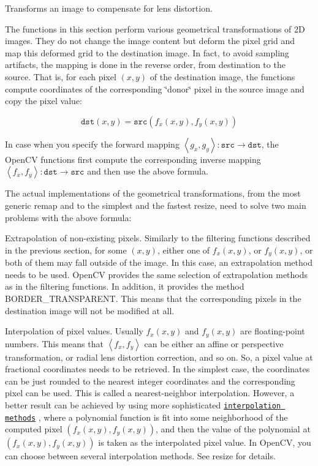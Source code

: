 Transforms an image to compensate for lens distortion.

The functions in this section perform various geometrical transformations of 2D images. They do not change the image content but deform the pixel grid and map this deformed grid to the destination image. In fact, to avoid sampling artifacts, the mapping is done in the reverse order, from destination to the source. That is, for each pixel $(x, y)$ of the destination image, the functions compute coordinates of the corresponding \char`\"{}donor\char`\"{} pixel in the source image and copy the pixel value\+: 

\[\texttt{dst} (x,y)= \texttt{src} (f_x(x,y), f_y(x,y))\] 

In case when you specify the forward mapping $\left<g_x, g_y\right>: \texttt{src} \rightarrow \texttt{dst}$, the Open\+CV functions first compute the corresponding inverse mapping $\left<f_x, f_y\right>: \texttt{dst} \rightarrow \texttt{src}$ and then use the above formula. 

The actual implementations of the geometrical transformations, from the most generic remap and to the simplest and the fastest resize, need to solve two main problems with the above formula\+: 


\begin{DoxyItemize}
\item Extrapolation of non-\/existing pixels. Similarly to the filtering functions described in the previous section, for some $(x,y)$, either one of $f_x(x,y)$, or $f_y(x,y)$, or both of them may fall outside of the image. In this case, an extrapolation method needs to be used. Open\+CV provides the same selection of extrapolation methods as in the filtering functions. In addition, it provides the method B\+O\+R\+D\+E\+R\+\_\+\+T\+R\+A\+N\+S\+P\+A\+R\+E\+NT. This means that the corresponding pixels in the destination image will not be modified at all. 
\end{DoxyItemize}


\begin{DoxyItemize}
\item Interpolation of pixel values. Usually $f_x(x,y)$ and $f_y(x,y)$ are floating-\/point numbers. This means that $\left<f_x, f_y\right>$ can be either an affine or perspective transformation, or radial lens distortion correction, and so on. So, a pixel value at fractional coordinates needs to be retrieved. In the simplest case, the coordinates can be just rounded to the nearest integer coordinates and the corresponding pixel can be used. This is called a nearest-\/neighbor interpolation. However, a better result can be achieved by using more sophisticated \href{http://en.wikipedia.org/wiki/Multivariate_interpolation}{\tt interpolation methods} , where a polynomial function is fit into some neighborhood of the computed pixel $(f_x(x,y), f_y(x,y))$, and then the value of the polynomial at $(f_x(x,y), f_y(x,y))$ is taken as the interpolated pixel value. In Open\+CV, you can choose between several interpolation methods. See resize for details. 
\end{DoxyItemize}

